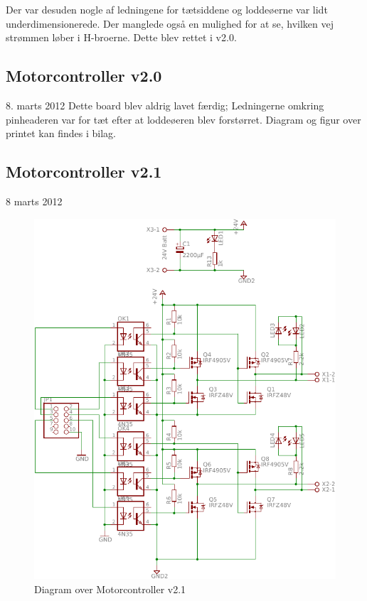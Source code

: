 \documentclass[a4paper,twoside,article,danish,table]{memoir}
\newcommand{\boarddate}[1]{\textcolor{blue!80!black}{#1}}
\begin{document}
Der var desuden nogle af ledningene for tætsiddene og loddeøerne var lidt underdimensionerede. Der manglede også en mulighed for at se, hvilken vej strømmen løber i H-broerne. Dette blev rettet i v2.0.
\subsection{Motorcontroller v2.0}
\boarddate{8. marts 2012} Dette board blev aldrig lavet færdig; Ledningerne omkring pinheaderen var for tæt efter at loddeøeren blev forstørret. Diagram og figur over printet kan findes i bilag. 

\subsection{Motorcontroller v2.1}
\boarddate{8 marts 2012}
\begin{figure}[htbp]
  \centering
  \includegraphics[width=\textwidth]{pictures/MotorcontrollerSch2-1.pdf}
  \caption{Diagram over Motorcontroller v2.1}
  \label{fig:mosch2.1}
\end{figure}
\end{document}
